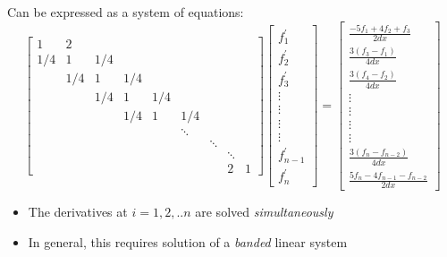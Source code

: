 \documentclass[8pt]{beamer}
\begin{document}
\begin{frame}
\footnotesize
Can be expressed as a system of equations:
\begin{equation*}
 \begin{bmatrix}
     1&2\\
     1/4&1&1/4\\
     &1/4&1&1/4\\
     &&1/4&1&1/4\\
     &&&1/4&1&1/4\\
     &&&&&\ddots\\
     &&&&&&\ddots\\
     &&&&&&&\ddots\\
     &&&&&&&2&1
  \end{bmatrix}
  \begin{bmatrix}
      f^{\prime}_1 \\

      f^{\prime}_2 \\
      f^{\prime}_3 \\
      \vdots \\
      \vdots \\
      \vdots \\
      \vdots \\
      f^{\prime}_{n-1} \\
      f^{\prime}_n
   \end{bmatrix}
 =
 \begin{bmatrix}
     \frac{-5f_1 + 4f_2 + f_3}{2dx}\\
     \frac{3(f_{3} - f_{1})}{4dx}\\
     \frac{3(f_{4} - f_{2})}{4dx}\\
     \vdots\\
     \vdots\\
     \vdots\\
     \vdots\\
     \frac{3(f_{n} - f_{n-2})}{4dx}\\
     \frac{5f_{n} - 4f_{n-1} - f_{n-2}}{2dx}
  \end{bmatrix}
\end{equation*}

\pause
\begin{itemize}[<+->]
    \item The derivatives at $i=1,2, .. n$ are solved \emph{simultaneously}
    \item In general, this requires solution of a \emph{banded} linear system
\end{itemize}
\end{frame}
\end{document}
